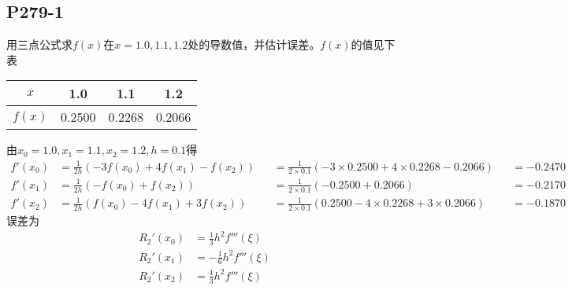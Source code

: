 \subsection{P279-1}
用三点公式求$f(x)$在$x = 1.0, 1.1, 1.2$处的导数值，并估计误差。$f(x)$的值见下表
\begin{center}
\begin{tabular}{c|c c c}
$x$ & 1.0 & 1.1 & 1.2 \\
\hline
$f(x)$ & 0.2500 & 0.2268 & 0.2066
\end{tabular}
\end{center}
\begin{SOLVE}
由$x_0 = 1.0, x_1 = 1.1, x_2 = 1.2, h = 0.1$得
\begin{align*}
f'(x_0) & = \frac{1}{2h}(-3f(x_0) + 4 f(x_1) - f(x_2)) &
        & = \frac{1}{2 \times 0.1}(-3 \times 0.2500 + 4 \times 0.2268 - 0.2066) &
        & = -0.2470 \\
f'(x_1) & = \frac{1}{2h}(- f(x_0) + f(x_2)) &
        & = \frac{1}{2 \times 0.1}(-0.2500 + 0.2066) &
        & = -0.2170 \\
f'(x_2) & = \frac{1}{2h}(f(x_0) - 4 f(x_1) + 3 f(x_2)) &
        & = \frac{1}{2 \times 0.1}(0.2500 - 4 \times 0.2268 + 3 \times 0.2066) &
        & = -0.1870
\end{align*}
误差为
\begin{align*}
R_2'(x_0) & = \frac{1}{3}h^2 f'''(\xi) \\
R_2'(x_1) & = - \frac{1}{6}h^2 f'''(\xi) \\
R_2'(x_2) & = \frac{1}{3}h^2 f'''(\xi)
\end{align*}
\end{SOLVE}